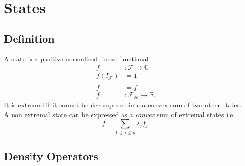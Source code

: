 \documentclass[aps,preprint]{revtex4}%
\begin{document}
\section{States}

\subsection{Definition}

\qquad A state is a positive normalized linear functional
\begin{align}
f  &  :\mathcal{F}\rightarrow\mathbb{C}\\
f\left(  I_{\mathcal{F}}\right)   &  =1\\
f  &  =f^{\dagger}\\
f  &  :\mathcal{F}_{sa}\rightarrow\mathbb{R}.
\end{align}
It is extremal if it cannot be decomposed into a convex sum of two other
states. A non extremal state can be expressed as a \emph{convex} sum of
extremal states i.e.
\begin{equation}
f=\sum_{1\leq j\leq p}\lambda_{j}f_{j}.
\end{equation}


\subsection{Density Operators}
\end{document}
